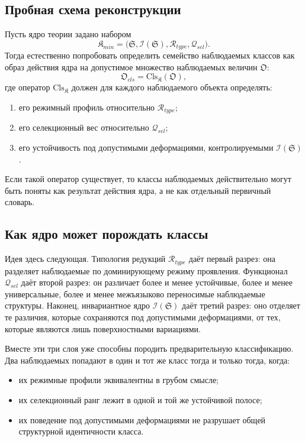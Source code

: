 \documentclass[12pt,a4paper]{article}
\begin{document}
\subsection{Пробная схема реконструкции}

Пусть ядро теории задано набором
\begin{equation}
\mathfrak{K}_{min}=\bigl(\mathfrak{S},\mathcal{I}(\mathfrak{S}),\mathcal{R}_{type},\mathcal{Q}_{sel}\bigr).
\end{equation}
Тогда естественно попробовать определить семейство наблюдаемых классов как образ действия ядра на допустимое множество наблюдаемых величин \(\mathfrak{O}\):
\begin{equation}
\mathfrak{O}_{cls}=\mathrm{Cls}_{\mathfrak{K}}(\mathfrak{O}),
\end{equation}
где оператор \(\mathrm{Cls}_{\mathfrak{K}}\) должен для каждого наблюдаемого объекта определять:
\begin{enumerate}
    \item его режимный профиль относительно \(\mathcal{R}_{type}\);
    \item его селекционный вес относительно \(\mathcal{Q}_{sel}\);
    \item его устойчивость под допустимыми деформациями, контролируемыми \(\mathcal{I}(\mathfrak{S})\).
\end{enumerate}

Если такой оператор существует, то классы наблюдаемых действительно могут быть поняты как результат действия ядра, а не как отдельный первичный словарь.

\subsection{Как ядро может порождать классы}

Идея здесь следующая. Типология редукций \(\mathcal{R}_{type}\) даёт первый разрез: она разделяет наблюдаемые по доминирующему режиму проявления. Функционал \(\mathcal{Q}_{sel}\) даёт второй разрез: он различает более и менее устойчивые, более и менее универсальные, более и менее межъязыково переносимые наблюдаемые структуры. Наконец, инвариантное ядро \(\mathcal{I}(\mathfrak{S})\) даёт третий разрез: оно отделяет те различия, которые сохраняются под допустимыми деформациями, от тех, которые являются лишь поверхностными вариациями.

Вместе эти три слоя уже способны породить предварительную классификацию. Два наблюдаемых попадают в один и тот же класс тогда и только тогда, когда:
\begin{itemize}
    \item их режимные профили эквивалентны в грубом смысле;
    \item их селекционный ранг лежит в одной и той же устойчивой полосе;
    \item их поведение под допустимыми деформациями не разрушает общей структурной идентичности класса.
\end{itemize}
\end{document}
